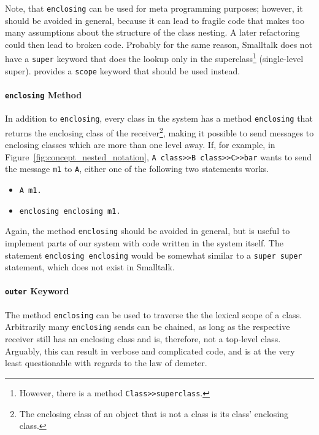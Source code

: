 Note, that \texttt{enclosing} can be used for meta programming purposes; however, it should be avoided in general, because it can lead to fragile code that makes too many assumptions about the structure of the class nesting. A later refactoring could then lead to broken code. Probably for the same reason, Smalltalk does not have a \texttt{super} keyword that does the lookup only in the superclass\footnote{However, there is a method \texttt{Class>>superclass}.} (single-level super). \msname provides a \texttt{scope} keyword that should be used instead.

\paragraph{\texttt{enclosing} Method}
In addition to \texttt{enclosing}, every class in the system has a method \texttt{enclosing} that returns the enclosing class of the receiver\footnote{The enclosing class of an object that is not a class is its class' enclosing class.}, making it possible to send messages to enclosing classes which are more than one level away. If, for example, in Figure~\ref{fig:concept_nested_notation}, \texttt{A class>>B class>>C>>bar} wants to send the message \texttt{m1} to \texttt{A}, either one of the following two statements works.

\begin{itemize}
	\item \texttt{A m1.}
	\item \texttt{enclosing enclosing m1.}
\end{itemize}

Again, the method \texttt{enclosing} should be avoided in general, but is useful to implement parts of our system with code written in the system itself. The statement \texttt{enclosing enclosing} would be somewhat similar to a \texttt{super super} statement, which does not exist in Smalltalk.

\paragraph{\texttt{outer} Keyword}
The method \texttt{enclosing} can be used to traverse the the lexical scope of a class. Arbitrarily many \texttt{enclosing} sends can be chained, as long as the respective receiver still has an enclosing class and is, therefore, not a top-level class. Arguably, this can result in verbose and complicated code, and is at the very least questionable with regards to the law of demeter.

